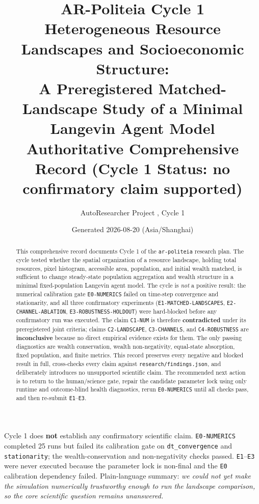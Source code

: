 \documentclass[11pt,a4paper]{article}
\title{\bfseries AR-Politeia Cycle 1\\[0.35em]
\large Heterogeneous Resource Landscapes and Socioeconomic Structure:\\
A Preregistered Matched-Landscape Study of a Minimal Langevin Agent Model\\[0.5em]
\Large Authoritative Comprehensive Record (Cycle 1 Status: no confirmatory claim supported)}
\author{AutoResearcher Project \code{ar-politeia}, Cycle 1}
\date{Generated 2026-08-20 (Asia/Shanghai)}
\newcommand{\code}[1]{\texttt{#1}}
\begin{document}
\maketitle

\begin{abstract}
This comprehensive record documents Cycle 1 of the \code{ar-politeia} research
plan. The cycle tested whether the spatial organization of a resource
landscape, holding total resources, pixel histogram, accessible area,
population, and initial wealth matched, is sufficient to change steady-state
population aggregation and wealth structure in a minimal fixed-population
Langevin agent model. The cycle is \emph{not} a positive result: the numerical
calibration gate \code{E0-NUMERICS} failed on time-step convergence and
stationarity, and all three confirmatory experiments
(\code{E1-MATCHED-LANDSCAPES}, \code{E2-CHANNEL-ABLATION},
\code{E3-ROBUSTNESS-HOLDOUT}) were hard-blocked before any confirmatory run was
executed. The claim \code{C1-NUM} is therefore \textbf{contradicted} under its
preregistered joint criteria; claims \code{C2-LANDSCAPE},
\code{C3-CHANNELS}, and \code{C4-ROBUSTNESS} are \textbf{inconclusive} because
no direct empirical evidence exists for them. The only passing diagnostics are
wealth conservation, wealth non-negativity, equal-state absorption, fixed
population, and finite metrics. This record preserves every negative and
blocked result in full, cross-checks every claim against
\code{research/findings.json}, and deliberately introduces no unsupported
scientific claim. The recommended next action is to return to the human/science
gate, repair the candidate parameter lock using only runtime and outcome-blind
health diagnostics, rerun \code{E0-NUMERICS} until all checks pass, and then
re-submit \code{E1}--\code{E3}.
\end{abstract}

\begin{keybox}
Cycle 1 does \textbf{not} establish any confirmatory scientific claim.
\code{E0-NUMERICS} completed 25 runs but failed its calibration gate on
\code{dt\_convergence} and \code{stationarity}; the wealth-conservation and
non-negativity checks passed. \code{E1}--\code{E3} were never executed because
the parameter lock is non-final and the \code{E0} calibration dependency failed.
Plain-language summary: \emph{we could not yet make the simulation numerically
trustworthy enough to run the landscape comparison, so the core scientific
question remains unanswered.}
\end{keybox}
\end{document}
